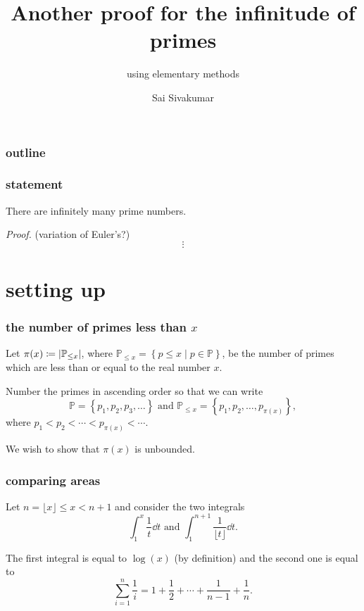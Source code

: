 \documentclass[mathserif]{beamer}
\title[Another proof for the infinitude of primes] %
{Another proof for the infinitude of primes}
\subtitle{using elementary methods}
\author[Sai Sivakumar] %
{Sai Sivakumar}
\newcommand{\cbr}[1]{\left\{#1\right\}}
\begin{document}
\frame{\titlepage}

\begin{frame}
\frametitle{outline}
\tableofcontents
\end{frame}

\begin{frame}
  \frametitle{statement}
  \begin{theorem}
    There are infinitely many prime numbers.
  \end{theorem}
  \textit{Proof.} (variation of Euler's?)
  \[\vdots\]
\end{frame}

\section{setting up}

\begin{frame}
  \frametitle{the number of primes less than $x$}
  Let $\pi(x) \coloneqq \abs{\mathbb{P}_{\leq x}}$, where $\mathbb{P}_{\leq x} = \cbr{p\leq x\mid p \in\mathbb{P}}$, be the number of primes which are less than or equal to the real number $x$.

  Number the primes in ascending order so that we can write \[\mathbb{P} = \cbr{p_1,p_2,p_3,\dots}\text{ and }\mathbb{P}_{\leq x} = \cbr{p_1,p_2,\dots,p_{\pi(x)}},\] where $p_1 < p_2 < \cdots < p_{\pi(x)} < \cdots$.

  We wish to show that $\pi(x)$ is unbounded.
\end{frame}

\begin{frame}
  \frametitle{comparing areas}
  Let $n = \lfloor x \rfloor \leq x < n+1$ and consider the two integrals \[\int_1^x \frac{1}{t}\dd{t} \text{ and } \int_1^{n+1} \frac{1}{\lfloor t \rfloor}\dd{t}.\]

  The first integral is equal to $\log(x)$ (by definition) and the second one is equal to \[\sum_{i=1}^n\frac{1}{i} = 1 + \frac{1}{2} + \cdots + \frac{1}{n-1} + \frac{1}{n}.\]
\end{frame}
\end{document}
